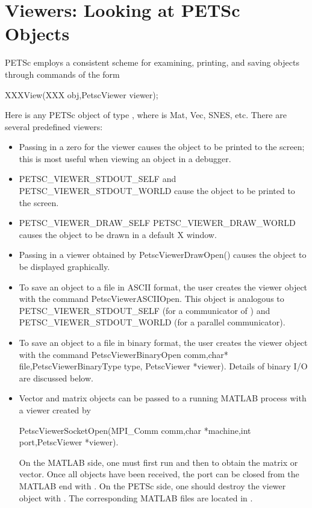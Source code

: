 {{{\section{Viewers: Looking at PETSc Objects} \label{sec_viewers}

PETSc employs a consistent scheme for examining, printing, and 
saving objects through commands of the form
\begin{tabbing}
  XXXView(XXX obj,PetscViewer viewer);
\end{tabbing}
Here  is any PETSc object of type
,  where  
is Mat, Vec, SNES, etc. There are several
predefined viewers:
\begin{itemize}
\item Passing in a zero for the viewer causes the object to be printed 
      to the screen; this is most useful when viewing an object in 
      a debugger.
\item PETSC_VIEWER_STDOUT_SELF and 
      PETSC_VIEWER_STDOUT_WORLD
      cause the object to be printed to the screen.

\item PETSC_VIEWER_DRAW_SELF
      PETSC_VIEWER_DRAW_WORLD causes the 
      object to be drawn in a default X window.
\item Passing in a viewer obtained by
      PetscViewerDrawOpen() causes the object to be displayed graphically.
\item To save an object to a file in ASCII format, the user creates
      the viewer object with the command
      PetscViewerASCIIOpen.  
      This object is 
      analogous to PETSC_VIEWER_STDOUT_SELF (for a communicator of
      ) and 
      PETSC_VIEWER_STDOUT_WORLD (for a parallel communicator).
\item To save an object to a file in binary format, the user creates
      the viewer object with the command
      PetscViewerBinaryOpen comm,char* file,PetscViewerBinaryType type,
      PetscViewer *viewer). Details of binary
      I/O are discussed below.
\item Vector and matrix objects can be passed to a running MATLAB process
      with a viewer created by 
\begin{tabbing}
     PetscViewerSocketOpen(MPI\_Comm comm,char *machine,int port,PetscViewer *viewer). 
\end{tabbing} 
      On the MATLAB side, one must first run 
      and then  to obtain the matrix or vector. Once all
      objects have been received, the port can be closed from the MATLAB end
      with . On the PETSc side, one should destroy
      the viewer object with  . The corresponding MATLAB 
      files are located in .
\end{itemize}

}}}
